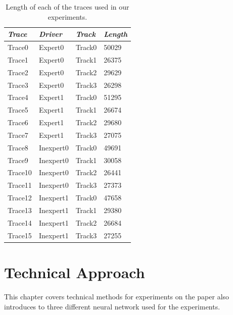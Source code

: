 \documentclass[draft,dvipsnames]{drexel-thesis}
\begin{document}
\begin{thesis}
\begin{table}[!t]
\centering
\caption{Length of each of the traces used in our experiments.}
\label{tbl:traces}
\begin{tabular}{|l|l|l|l|}
\hline
{\em Trace}   & {\em Driver}    & {\em Track}  & {\em Length} \\ \hline
Trace0  & Expert0   & Track0 & 50029  \\
Trace1  & Expert0   & Track1 & 26375  \\
Trace2  & Expert0   & Track2 & 29629  \\
Trace3  & Expert0   & Track3 & 26298  \\
Trace4  & Expert1   & Track0 & 51295  \\
Trace5  & Expert1   & Track1 & 26674  \\
Trace6  & Expert1   & Track2 & 29680  \\
Trace7  & Expert1   & Track3 & 27075  \\
Trace8  & Inexpert0 & Track0 & 49691  \\
Trace9  & Inexpert0 & Track1 & 30058  \\
Trace10 & Inexpert0 & Track2 & 26441  \\
Trace11 & Inexpert0 & Track3 & 27373  \\
Trace12 & Inexpert1 & Track0 & 47658  \\
Trace13 & Inexpert1 & Track1 & 29380  \\
Trace14 & Inexpert1 & Track2 & 26684  \\
Trace15 & Inexpert1 & Track3 & 27255  \\ \hline
\end{tabular}
\end{table}


\chapter{Technical Approach}

This chapter covers technical methods for experiments on the paper also introduces to three different neural network used for the experiments.



\end{thesis}
\end{document}
